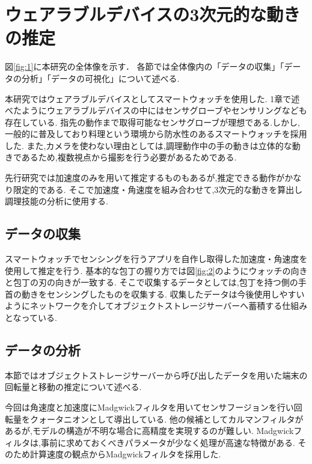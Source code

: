 \section{ウェアラブルデバイスの3次元的な動きの推定}
図\ref{fig:1}に本研究の全体像を示す．
各節では全体像内の「データの収集」「データの分析」「データの可視化」について述べる.

本研究ではウェアラブルデバイスとしてスマートウォッチを使用した.
1章で述べたようにウェアラブルデバイスの中にはセンサグローブやセンサリングなども存在している.
指先の動作まで取得可能なセンサグローブが理想である.しかし,一般的に普及しており料理という環境から防水性のあるスマートウォッチを採用した.
また,カメラを使わない理由としては,調理動作中の手の動きは立体的な動きであるため,複数視点から撮影を行う必要があるためである.

先行研究\cite{kumazawaanalysis}では加速度のみを用いて推定するものもあるが,推定できる動作がかなり限定的である.
そこで加速度・角速度を組み合わせて,3次元的な動きを算出し調理技能の分析に使用する.


\subsection{データの収集}
スマートウォッチでセンシングを行うアプリを自作し取得した加速度・角速度を使用して推定を行う.
基本的な包丁の握り方では図\ref{fig:2}のようにウォッチの向きと包丁の刃の向きが一致する.
そこで収集するデータとしては,包丁を持つ側の手首の動きをセンシングしたものを収集する.
収集したデータは今後使用しやすいようにネットワークを介してオブジェクトストレージサーバーへ蓄積する仕組みとなっている.
\subsection{データの分析}
本節ではオブジェクトストレージサーバーから呼び出したデータを用いた端末の回転量と移動の推定について述べる.

今回は角速度と加速度にMadgwickフィルタを用いてセンサフージョンを行い回転量をクォータニオンとして導出している.
他の候補としてカルマンフィルタがあるが,モデルの構造が不明な場合に高精度を実現するのが難しい.
Madgwickフィルタは,事前に求めておくべきパラメータが少なく処理が高速な特徴がある.
そのため計算速度の観点からMadgwickフィルタを採用した.

